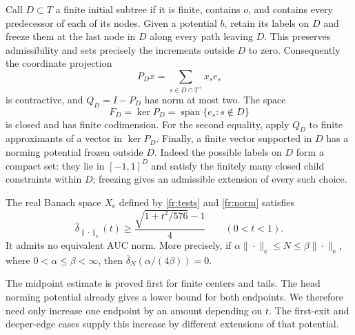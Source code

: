 Call $D\subset T$ a finite initial subtree if it is finite, contains
$o$, and contains every predecessor of each of its nodes.  Given a
potential $b$, retain its labels on $D$ and freeze them at the last node
in $D$ along every path leaving $D$.  This preserves admissibility and
sets precisely the increments outside $D$ to zero.  Consequently the
coordinate projection
\[
 P_Dx=\sum_{s\in D\cap T^+}x_se_s
\]
is contractive, and $Q_D=I-P_D$ has norm at most two.  The space
\begin{equation}
 F_D=\ker P_D
   =\overline{\operatorname{span}}\{e_s:s\notin D\}
 \label{fr:tail}
\end{equation}
is closed and has finite codimension.  For the second equality, apply
$Q_D$ to finite approximants of a vector in $\ker P_D$.
Finally, a finite vector supported in $D$ has a norming potential frozen
outside $D$.  Indeed the possible labels on $D$ form a compact set:
they lie in $[-1,1]^D$ and satisfy the finitely many closed child
constraints within $D$; freezing gives an admissible extension of every
such choice.

\begin{theorem}
\label{thm:free-root-modulus}
The real Banach space $X_{\mathrm e}$ defined by \eqref{fr:tests} and
\eqref{fr:norm} satisfies
\begin{equation}
 \widehat\delta_{\|\cdot\|_{\mathrm e}}(t)
 \ge\frac{\sqrt{1+t^2/576}-1}{4}\qquad(0<t<1).
 \label{fr:modulus}
\end{equation}
It admits no equivalent AUC norm.  More precisely, if
$\alpha\|\cdot\|_{\mathrm e}\le N\le\beta\|\cdot\|_{\mathrm e}$,
where $0<\alpha\le\beta<\infty$, then
$\overline\delta_N(\alpha/(4\beta))=0$.
\end{theorem}

The midpoint estimate is proved first for finite centers and tails.
The head norming potential already gives a lower bound for both
endpoints.  We therefore need only increase one endpoint by an amount
depending on $t$.  The first-exit and deeper-edge cases supply this
increase by different extensions of that potential.

